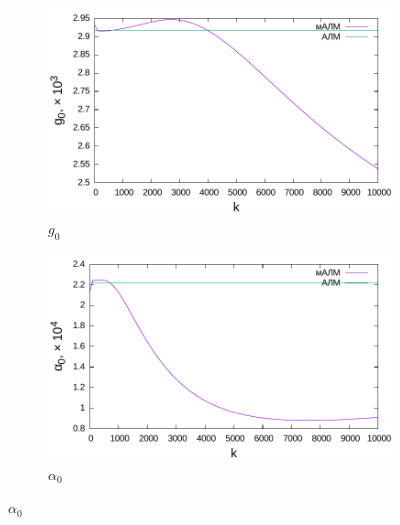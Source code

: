\documentclass[11pt,a4paper]{article}
\begin{document}
\begin{figure}[h]
  \centering
  \begin{subfigure}[b]{0.7\textwidth}
    \includegraphics[width=\textwidth]{figs/levmar/convergence/convergence_10000.txt_g.pdf}
    \caption{$g_0$}
  \end{subfigure}

  \begin{subfigure}[b]{0.7\textwidth}
    \includegraphics[width=\textwidth]{figs/levmar/convergence/convergence_10000.txt_alpha.pdf}
    \caption{$\alpha_0$}
  \end{subfigure}


\end{figure}
\end{document}
